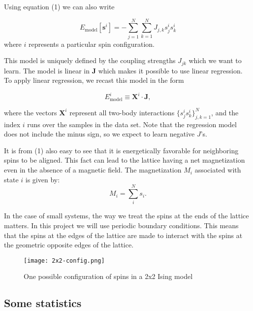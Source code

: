 \documentclass[a4paper,12pt]{article}
\begin{document}
Using equation (1) we can also write

\begin{equation}
    E_\mathrm{model}[\boldsymbol{s}^i] = - \sum_{j=1}^N \sum_{k=1}^N J_{j,k}s_{j}^is_{k}^i
\end{equation}
where $i$ represents a particular spin configuration.

This model is uniquely defined by the coupling strengths $J_{jk}$ which we want to learn.
The model is linear in $\mathbf{J}$ which makes it possible to use linear regression.\newline
To apply linear regression, we recast this model in the form

\begin{equation}
    E_\mathrm{model}^i \equiv \mathbf{X}^i \cdot \mathbf{J},
\end{equation}

where the vectors $\mathbf{X}^i$ represent all two-body interactions
$\{s_{j}^is_{k}^i \}_{j,k=1}^N$, and the index $i$ runs over the
samples in the data set. Note that the
regression model does not include the minus sign, so we expect to
learn negative $J$'s.\newline

It is from (1) also easy to see that it is energetically favorable for neighboring spins to be aligned. This fact can lead to the lattice having a net magnetization even in the absence of a magnetic field.\newline
The magnetization $M_i$ associated with state $i$ is given by:
\begin{equation}
    M_i = \sum_{i}^{N}s_i.
\end{equation}

In the case of small systems, the way we treat the spins at the ends of the lattice matters. In this project we will use periodic boundary conditions. This means that the spins at the edges of the lattice are made to interact with the spins at the geometric opposite edges of the lattice.

\begin{figure}[h!]
  \centering
  \caption{One possible configuration of spins in a 2x2 Ising model}
  \texttt{[image: 2x2-config.png]}
\end{figure}

\subsection{Some statistics}
\end{document}
